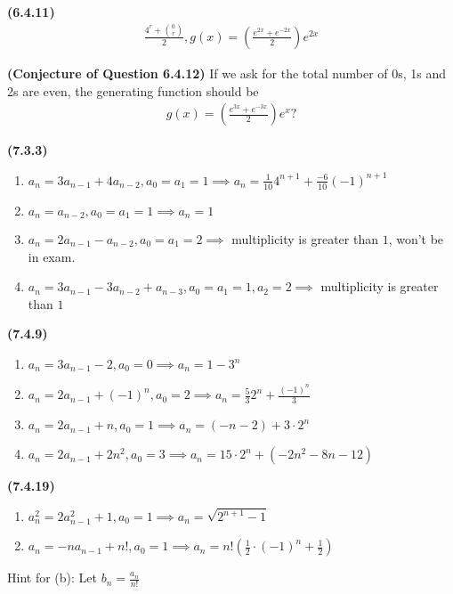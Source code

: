 \documentclass{report}
\begin{document}
\begin{theorem}
\textbf{(6.4.11)}
\begin{align*}
\frac{4^r + \binom{0}{r}}{2}, g(x)=(\frac{e^{2x}+e^{-2x}}{2})e^{2x}
\end{align*}
\end{theorem}
\begin{theorem}
\textbf{(Conjecture of Question 6.4.12)} If we ask for the total number of 0s, 1s and 2s are even, the generating function should be 
 \begin{align*}
g(x)=(\frac{e^{3x}+e^{-3x}}{2})e^x?
\end{align*}
\end{theorem}
\begin{theorem}
\textbf{(7.3.3)}
\begin{enumerate}[label=(\alph*)]
  \item $a_n=3a_{n-1}+4a_{n-2},a_0=a_1=1\implies a_n=\frac{1}{10}4^{n+1}+ \frac{-6}{10}(-1)^{n+1}$ 
  \item $a_n=a_{n-2},a_0=a_1=1\implies a_n=1$
  \item $a_n=2a_{n-1}-a_{n-2}, a_0=a_1=2\implies $ multiplicity is greater than $1$, won't be in exam. 
  \item $a_n=3a_{n-1}-3a_{n-2}+a_{n-3}, a_0=a_1=1,a_2=2\implies $ multiplicity is greater than $1$
\end{enumerate}
\end{theorem}
\begin{theorem}
\textbf{(7.4.9)}
\begin{enumerate}[label=(\alph*)]
  \item $a_n=3a_{n-1}-2,a_0=0\implies a_n=1-3^n$ 
  \item $a_n=2a_{n-1}+(-1)^n,a_0=2 \implies a_n=\frac{5}{3}2^n + \frac{(-1)^n}{3}$ 
  \item $a_n=2a_{n-1}+n ,a_0=1 \implies a_n=(-n-2)+3 \cdot 2^n$ 
  \item $a_n=2a_{n-1}+2n^2,a_0=3 \implies a_n=15 \cdot 2^n+ (-2n^2-8n-12)$
\end{enumerate}
\end{theorem}
\begin{theorem}
\textbf{(7.4.19)}
\begin{enumerate}[label=(\alph*)]
  \item $a_n^2=2a_{n-1}^2 +1, a_0=1 \implies a_n=\sqrt{2^{n+1}-1} $ 
  \item $a_n=-na_{n-1}+n!,a_0=1 \implies a_n=n!(\frac{1}{2}\cdot (-1)^n+\frac{1}{2})$ 
\end{enumerate}
Hint for (b): Let  $b_n=\frac{a_n}{n!}$
\end{theorem}
\end{document}
